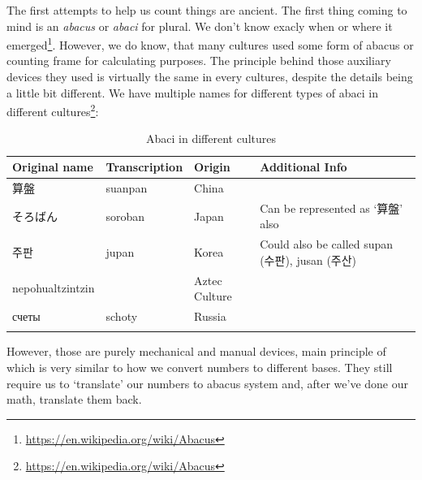 \documentclass[../../what-is-computer]{subfiles}
\begin{document}
    The first attempts to help us count things are ancient. The first thing coming to mind is an \emph{abacus} or \emph{abaci} for plural. We don't know exacly when or
    where it emerged\footnote{\href{https://en.wikipedia.org/wiki/Abacus}{https://en.wikipedia.org/wiki/Abacus}}. However, we do know, that many cultures used some form
    of abacus or counting frame for calculating purposes. The principle behind those auxiliary devices they used is virtually the same in every cultures, despite the 
    details being a little bit different. We have multiple names for different types of abaci in different
    cultures\footnote{\href{https://en.wikipedia.org/wiki/Abacus}{https://en.wikipedia.org/wiki/Abacus}}:
    \begin{table}[h]
        \centering
        \begin{longtable} {p{}p{}p{}p{}}
            \toprule
            Original name & Transcription & Origin & Additional Info \\
            \toprule
            算盤 & suanpan & China & \\
            そろばん & soroban & Japan & Can be represented as `算盤' also \\
            주판 & jupan & Korea & Could also be called supan (수판), jusan (주산) \\
            nepohualtzintzin & & Aztec Culture & \\
            счеты & schoty & Russia & \\
            \bottomrule
            \caption{Abaci in different cultures}
            \end{longtable}
    \end{table}

    \newpage


    However, those are purely mechanical and manual devices, main principle of which is very similar to how we convert numbers to different bases. They still
    require us to `translate' our numbers to abacus system and, after we've done our math, translate them back. \par
\end{document}
